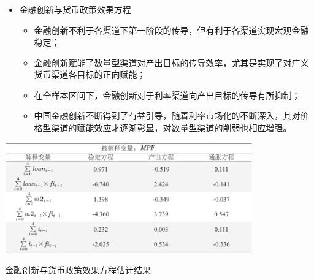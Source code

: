 \documentclass[12pt,aspectratio=169]{ctexbeamer}
\begin{document}
			\begin{frame}
				\frametitle{}
				\vspace{2mm}
				\begin{itemize}
					\item 金融创新与货币政策效果方程
					\begin{itemize}
						\justifying
						\footnotesize
						\item 金融创新不利于各渠道下第一阶段的传导，但有利于各渠道实现宏观金融稳定；
						\item 金融创新赋能了数量型渠道对产出目标的传导效率，尤其是实现了对广义货币渠道各目标的正向赋能；
						\item 在全样本区间下，金融创新对于利率渠道向产出目标的传导有所抑制；
						\item 中国金融创新不断得到了有益引导，随着利率市场化的不断深入，其对价格型渠道的赋能效应才逐渐彰显，对数量型渠道的削弱也相应增强。
					\end{itemize}
				\end{itemize}
				\begin{table}
					\centering
					\begin{minipage}{0.65\textwidth}
						\centering
						\includegraphics[width=0.8\textwidth]{figures/tab.6-2}
					\end{minipage}
					\hspace{-3mm}
					\begin{minipage}{0.25\textwidth}
						\caption{金融创新与货币政策效果方程估计结果}
						\label{tab.6-2}
					\end{minipage}
				\end{table}
			\end{frame}
\end{document}
